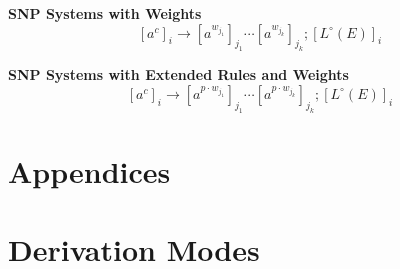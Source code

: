 \documentclass[a4paper]{article}
\theoremstyle{definition}
\newcommand{\ra}{\rightarrow}
\begin{document}
\noindent \textbf{SNP Systems with Weights}
$$[a^c]_i \ra [a^{w_{j_1}}]_{j_1} \cdots [a^{w_{j_k}}]_{j_k};[L^{\circ}(E)]_i$$

\noindent \textbf{SNP Systems with Extended Rules and  Weights}
$$[a^c]_i \ra [a^{p \cdot w_{j_1}}]_{j_1} \cdots [a^{p\cdot w_{j_k}}]_{j_k};[L^{\circ}(E)]_i$$


\appendix{}

\section*{Appendices}\label{app}
\section{Derivation Modes}\label{app-deri}

\cite{freund-2007-ff-1}
\end{document}
